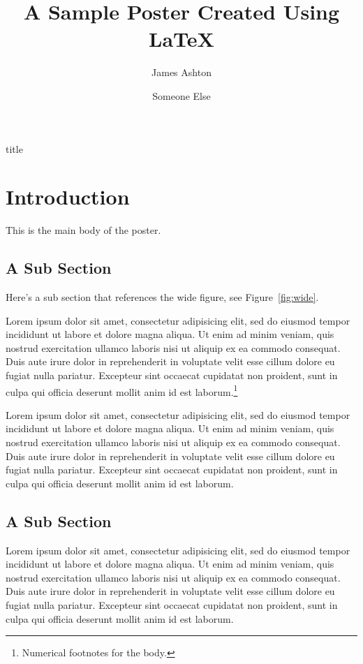 \documentclass[a0,landscape]{a0poster}
\title{A Sample Poster Created Using \LaTeX}
\date{}%
\author{James Ashton\protect\footnotemark[1]
\and
Someone Else\protect\footnotemark[2]}
\begin{document}
\begin{staticcontents*}{title}
\maketitle
\end{staticcontents*}
\thispagestyle{empty} 

\section{Introduction}

This is the main body of the poster.

\subsection{A Sub Section}

Here's a sub section that references the wide
figure, see Figure~\ref{fig:wide}.

Lorem ipsum dolor sit amet, consectetur adipisicing elit, sed do eiusmod
tempor incididunt ut labore et dolore magna aliqua. Ut enim ad minim
veniam, quis nostrud exercitation ullamco laboris nisi ut aliquip ex ea
commodo consequat. Duis aute irure dolor in reprehenderit in voluptate
velit esse cillum dolore eu fugiat nulla pariatur. Excepteur sint occaecat
cupidatat non proident, sunt in culpa qui officia deserunt mollit anim
id est laborum.\footnote{Numerical footnotes for the body.}

Lorem ipsum dolor sit amet, consectetur adipisicing elit, sed do eiusmod
tempor incididunt ut labore et dolore magna aliqua. Ut enim ad minim
veniam, quis nostrud exercitation ullamco laboris nisi ut aliquip ex ea
commodo consequat. Duis aute irure dolor in reprehenderit in voluptate
velit esse cillum dolore eu fugiat nulla pariatur. Excepteur sint occaecat
cupidatat non proident, sunt in culpa qui officia deserunt mollit anim
id est laborum.

\subsection{A Sub Section}

Lorem ipsum dolor sit amet, consectetur adipisicing elit, sed do eiusmod
tempor incididunt ut labore et dolore magna aliqua. Ut enim ad minim
veniam, quis nostrud exercitation ullamco laboris nisi ut aliquip ex ea
commodo consequat. Duis aute irure dolor in reprehenderit in voluptate
velit esse cillum dolore eu fugiat nulla pariatur. Excepteur sint occaecat
cupidatat non proident, sunt in culpa qui officia deserunt mollit anim
id est laborum.
\end{document}
